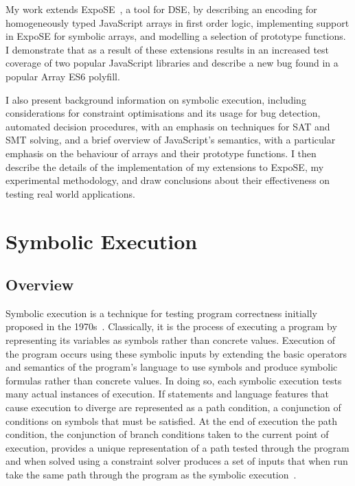 \documentclass[]{final_report}
\begin{document}
My work extends ExpoSE~\cite{Loring_2017}, a tool for DSE, by describing an encoding for homogeneously typed JavaScript arrays in first order logic, implementing support in ExpoSE for symbolic arrays, and modelling a selection of prototype functions. I demonstrate that as a result of these extensions results in an increased test coverage of two popular JavaScript libraries and describe a new bug found in a popular Array ES6 polyfill.

I also present background information on symbolic execution, including considerations for constraint optimisations and its usage for bug detection, automated decision procedures, with an emphasis on techniques for SAT and SMT solving, and a brief overview of JavaScript's semantics, with a particular emphasis on the behaviour of arrays and their prototype functions. I then describe the details of the implementation of my extensions to ExpoSE, my experimental methodology, and draw conclusions about their effectiveness on testing real world applications.

\chapter{Symbolic Execution}

\section{Overview}

Symbolic execution is a technique for testing program correctness initially proposed in the 1970s~\cite{king1976symbolic, boyer1975select}. Classically, it is the process of executing a program by representing its variables as symbols rather than concrete values. Execution of the program occurs using these symbolic inputs by extending the basic operators and semantics of the program's language to use symbols and produce symbolic formulas rather than concrete values. In doing so, each symbolic execution tests many actual instances of execution. If statements and language features that cause execution to diverge are represented as a path condition, a conjunction of conditions on symbols that must be satisfied. At the end of execution the path condition, the conjunction of branch conditions taken to the current point of execution, provides a unique representation of a path tested through the program and when solved using a constraint solver produces a set of inputs that when run take the same path through the program as the symbolic execution~\cite{godefroid2008automated, godefroid2005dart}.
\end{document}
